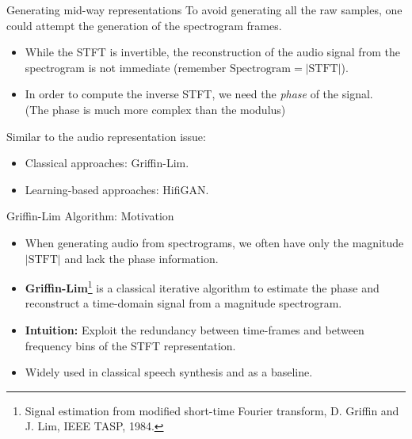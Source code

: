 \documentclass[11pt,aspectratio=169,usenames,dvipsnames]{beamer}
\begin{document}
\begin{frame}{Generating mid-way representations}
    To avoid generating all the raw samples, one could attempt the generation of the spectrogram frames.
    \begin{itemize}
        \item While the STFT is invertible, the reconstruction of the audio signal from the spectrogram is not immediate (remember $\text{Spectrogram}=|\text{STFT}|$).
        \item In order to compute the inverse STFT, we need the \textit{phase} of the signal.\\
        (The phase is much more complex than the modulus)
    \end{itemize}
Similar to the audio representation issue:
\begin{itemize}
    \item Classical approaches: Griffin-Lim.
    \item Learning-based approaches: HifiGAN.
\end{itemize}
\end{frame}

\begin{frame}{Griffin-Lim Algorithm: Motivation}
    \begin{itemize}
        \item When generating audio from spectrograms, we often have only the magnitude $|\text{STFT}|$ and lack the phase information.
        \item \textbf{Griffin-Lim}\footnote{Signal estimation from modified short-time Fourier transform, D. Griffin and J. Lim, IEEE TASP, 1984.} is a classical iterative algorithm to estimate the phase and reconstruct a time-domain signal from a magnitude spectrogram.
        \item \textbf{Intuition:} Exploit the redundancy between time-frames and between frequency bins of the STFT representation.
        \item Widely used in classical speech synthesis and as a baseline.
    \end{itemize}
\end{frame}
\end{document}
